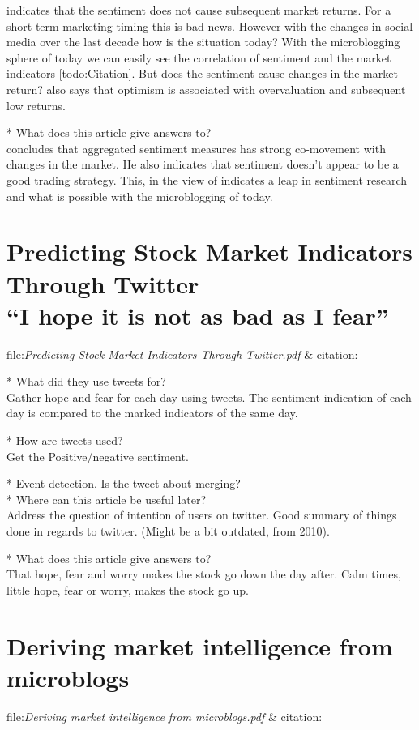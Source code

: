 \cite[p3]{Brown20041} indicates that the sentiment does not cause subsequent
market returns. For a short-term marketing timing this is bad news. However
with the changes in social media over the last decade how is the situation
today? With the microblogging sphere of today we can easily see the
correlation of sentiment and the market indicators [todo:Citation]. But
does the sentiment cause changes in the market-return? 
\cite[p3]{Brown20041} also says that optimism is associated with overvaluation and subsequent low returns.

* What does this article give answers to?\\
\cite[p]{Brown20041} concludes that aggregated sentiment measures has strong
co-movement with changes in the market. He also indicates that sentiment
doesn't appear to be a good trading strategy. This, in the view of
\cite[]{Zhang201155} indicates a leap in sentiment research and what is possible
with the microblogging of today. 

\section{Predicting Stock Market Indicators Through Twitter\\ “I hope it is not as bad as I fear”}
file:\textit{Predicting Stock Market Indicators Through Twitter.pdf} & citation:\cite[]{Zhang201155}

* What did they use tweets for?\\
Gather hope and fear for each day using tweets. 
The sentiment indication of each day is compared to the marked indicators of
the same day. 

* How are tweets used?\\
Get the Positive/negative sentiment. 

* Event detection. Is the tweet about merging? \\
* Where can this article be useful later? \\
Address the question of intention of users on twitter. 
Good summary of things done in regards to twitter. (Might be a bit outdated,
from 2010). 

* What does this article give answers to?\\
That hope, fear and worry makes the stock go down the day after. Calm times,
little hope, fear or worry, makes the stock go up. 


\section{Deriving market intelligence from microblogs}
file:\textit{Deriving market intelligence from microblogs.pdf} & citation:\cite[]{Li2013206}

